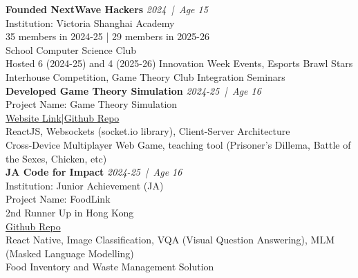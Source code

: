 \documentclass[a4paper,9pt]{extarticle}
\newcommand{\entryheader}[3]{%
    \noindent\textbf{#1} \hfill \textit{#2 \,|\, Age #3}
}
\begin{document}
    \noindent
    \entryheader{Founded NextWave Hackers}{2024}{15} \\
    Institution: Victoria Shanghai Academy \\
    35 members in 2024-25 | 29 members in 2025-26 \\
    School Computer Science Club \\
    Hosted 6 (2024-25) and 4 (2025-26) Innovation Week Events, Esports Brawl Stars Interhouse Competition, Game Theory Club Integration Seminars \\

    \noindent
    \entryheader{Developed Game Theory Simulation}{2024-25}{16} \\
    Project Name: Game Theory Simulation \\
    \href{https://game-theory-simulation-client.vercel.app/}{Website Link}|\href{https://github.com/godCoderXYZ/game-theory-simulation}{Github Repo} \\
    ReactJS, Websockets (socket.io library), Client-Server Architecture \\
    Cross-Device Multiplayer Web Game, teaching tool (Prisoner's Dillema, Battle of the Sexes, Chicken, etc) \\


    \noindent
    \entryheader{JA Code for Impact}{2024-25}{16} \\
    Institution: Junior Achievement (JA) \\
    Project Name: FoodLink \\
    2nd Runner Up in Hong Kong \\
    \href{https://github.com/godCoderXYZ/FoodLink}{Github Repo} \\
    React Native, Image Classification, VQA (Visual Question Answering), MLM (Masked Language Modelling) \\
    Food Inventory and Waste Management Solution \\
\end{document}
